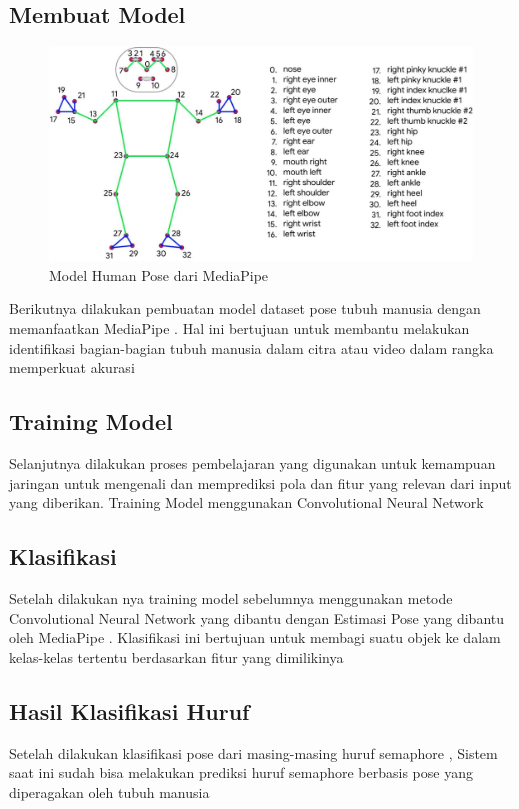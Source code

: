 \subsection{Membuat Model}
\begin{figure} [ht] \centering
  \includegraphics[scale=0.3]{gambar/humanpose.jpg}
  \caption{Model Human Pose dari MediaPipe}
  \label{fig:hasil}

\end{figure}
Berikutnya dilakukan pembuatan model dataset pose tubuh manusia dengan memanfaatkan MediaPipe . Hal ini bertujuan untuk membantu melakukan identifikasi bagian-bagian tubuh manusia dalam citra atau video dalam rangka memperkuat akurasi 

\subsection{Training Model}
Selanjutnya dilakukan proses pembelajaran yang digunakan untuk  kemampuan jaringan untuk mengenali dan memprediksi pola dan fitur yang relevan dari input yang diberikan. Training Model menggunakan Convolutional Neural Network

\subsection{Klasifikasi}
Setelah dilakukan nya training model sebelumnya menggunakan metode Convolutional Neural Network yang dibantu dengan Estimasi Pose yang dibantu oleh MediaPipe . Klasifikasi ini bertujuan untuk membagi suatu objek ke dalam kelas-kelas tertentu berdasarkan fitur yang dimilikinya

\subsection{Hasil Klasifikasi Huruf}
Setelah dilakukan klasifikasi pose dari masing-masing huruf semaphore , Sistem saat ini sudah bisa melakukan prediksi huruf semaphore berbasis pose yang diperagakan oleh tubuh manusia  

